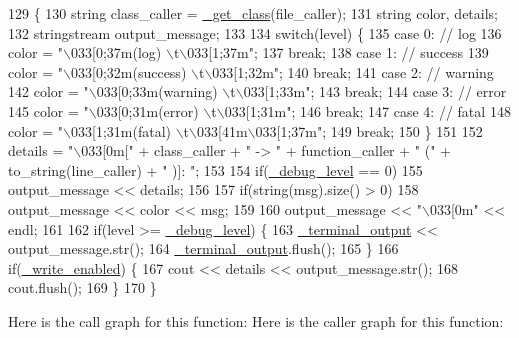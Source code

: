 \begin{DoxyCode}
129                                                                                                            
                             \{
130         \textcolor{keywordtype}{string} class\_caller = \hyperlink{namespace_debug_a93918301ef60cf635681cc925ef7cc49}{\_get\_class}(file\_caller);
131         \textcolor{keywordtype}{string} color, details;
132         stringstream output\_message;
133 
134         \textcolor{keywordflow}{switch}(level) \{
135             \textcolor{keywordflow}{case} 0: \textcolor{comment}{// log}
136                 color = \textcolor{stringliteral}{"\(\backslash\)033[0;37m(log) \(\backslash\)t\(\backslash\)033[1;37m"};
137             \textcolor{keywordflow}{break};
138             \textcolor{keywordflow}{case} 1: \textcolor{comment}{// success}
139                 color = \textcolor{stringliteral}{"\(\backslash\)033[0;32m(success) \(\backslash\)t\(\backslash\)033[1;32m"};
140             \textcolor{keywordflow}{break};
141             \textcolor{keywordflow}{case} 2: \textcolor{comment}{// warning}
142                 color = \textcolor{stringliteral}{"\(\backslash\)033[0;33m(warning) \(\backslash\)t\(\backslash\)033[1;33m"};
143             \textcolor{keywordflow}{break};
144             \textcolor{keywordflow}{case} 3: \textcolor{comment}{// error}
145                 color = \textcolor{stringliteral}{"\(\backslash\)033[0;31m(error) \(\backslash\)t\(\backslash\)033[1;31m"};
146             \textcolor{keywordflow}{break};
147             \textcolor{keywordflow}{case} 4: \textcolor{comment}{// fatal}
148                 color = \textcolor{stringliteral}{"\(\backslash\)033[1;31m(fatal) \(\backslash\)t\(\backslash\)033[41m\(\backslash\)033[1;37m"};
149             \textcolor{keywordflow}{break};
150         \}
151 
152         details = \textcolor{stringliteral}{"\(\backslash\)033[0m["} + class\_caller + \textcolor{stringliteral}{" -> "} + function\_caller + \textcolor{stringliteral}{" ("} + to\_string(line\_caller) + \textcolor{stringliteral}{"
      )]: "};
153 
154         \textcolor{keywordflow}{if}(\hyperlink{namespace_debug_ae3b1c0ac5502d48f0ae41e1bf5c7a68e}{\_debug\_level} == 0)
155             output\_message << details;
156 
157         \textcolor{keywordflow}{if}(\textcolor{keywordtype}{string}(msg).size() > 0)
158             output\_message << color << msg;
159 
160         output\_message << \textcolor{stringliteral}{"\(\backslash\)033[0m"} << endl;
161 
162         \textcolor{keywordflow}{if}(level >= \hyperlink{namespace_debug_ae3b1c0ac5502d48f0ae41e1bf5c7a68e}{\_debug\_level}) \{
163             \hyperlink{namespace_debug_af5e1c2d16e9f59de038ca0f29dfc564a}{\_terminal\_output} << output\_message.str();
164             \hyperlink{namespace_debug_af5e1c2d16e9f59de038ca0f29dfc564a}{\_terminal\_output}.flush();
165         \}
166         \textcolor{keywordflow}{if}(\hyperlink{namespace_debug_a8657663a88aedee7162eadf1cb87f17e}{\_write\_enabled}) \{
167             cout << details << output\_message.str();
168             cout.flush();
169         \}
170     \}
\end{DoxyCode}
Here is the call graph for this function\+:
Here is the caller graph for this function\+:


